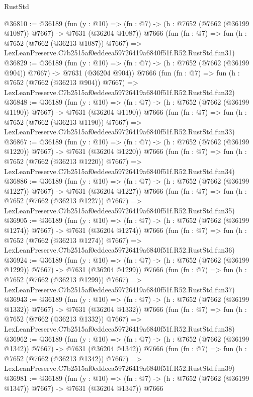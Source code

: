 \begin{lexlean}{RustStd}
\begin{coremodule}
@36810 := @36189
    (fun (y : @10) => (fn : @7) -> (h : @7652 (@7662 (@36199 @1087)) @7667) -> @7631 (@36204 @1087))
    @7666
    (fun (fn : @7) =>
    fun (h : @7652 (@7662 (@36213 @1087)) @7667) =>
    LexLeanPreserve.C7b2515af0eddeea59726419a6840f51f.R52.RustStd.fun31)
@36829 := @36189
    (fun (y : @10) => (fn : @7) -> (h : @7652 (@7662 (@36199 @904)) @7667) -> @7631 (@36204 @904))
    @7666
    (fun (fn : @7) =>
    fun (h : @7652 (@7662 (@36213 @904)) @7667) =>
    LexLeanPreserve.C7b2515af0eddeea59726419a6840f51f.R52.RustStd.fun32)
@36848 := @36189
    (fun (y : @10) => (fn : @7) -> (h : @7652 (@7662 (@36199 @1190)) @7667) -> @7631 (@36204 @1190))
    @7666
    (fun (fn : @7) =>
    fun (h : @7652 (@7662 (@36213 @1190)) @7667) =>
    LexLeanPreserve.C7b2515af0eddeea59726419a6840f51f.R52.RustStd.fun33)
@36867 := @36189
    (fun (y : @10) => (fn : @7) -> (h : @7652 (@7662 (@36199 @1220)) @7667) -> @7631 (@36204 @1220))
    @7666
    (fun (fn : @7) =>
    fun (h : @7652 (@7662 (@36213 @1220)) @7667) =>
    LexLeanPreserve.C7b2515af0eddeea59726419a6840f51f.R52.RustStd.fun34)
@36886 := @36189
    (fun (y : @10) => (fn : @7) -> (h : @7652 (@7662 (@36199 @1227)) @7667) -> @7631 (@36204 @1227))
    @7666
    (fun (fn : @7) =>
    fun (h : @7652 (@7662 (@36213 @1227)) @7667) =>
    LexLeanPreserve.C7b2515af0eddeea59726419a6840f51f.R52.RustStd.fun35)
@36905 := @36189
    (fun (y : @10) => (fn : @7) -> (h : @7652 (@7662 (@36199 @1274)) @7667) -> @7631 (@36204 @1274))
    @7666
    (fun (fn : @7) =>
    fun (h : @7652 (@7662 (@36213 @1274)) @7667) =>
    LexLeanPreserve.C7b2515af0eddeea59726419a6840f51f.R52.RustStd.fun36)
@36924 := @36189
    (fun (y : @10) => (fn : @7) -> (h : @7652 (@7662 (@36199 @1299)) @7667) -> @7631 (@36204 @1299))
    @7666
    (fun (fn : @7) =>
    fun (h : @7652 (@7662 (@36213 @1299)) @7667) =>
    LexLeanPreserve.C7b2515af0eddeea59726419a6840f51f.R52.RustStd.fun37)
@36943 := @36189
    (fun (y : @10) => (fn : @7) -> (h : @7652 (@7662 (@36199 @1332)) @7667) -> @7631 (@36204 @1332))
    @7666
    (fun (fn : @7) =>
    fun (h : @7652 (@7662 (@36213 @1332)) @7667) =>
    LexLeanPreserve.C7b2515af0eddeea59726419a6840f51f.R52.RustStd.fun38)
@36962 := @36189
    (fun (y : @10) => (fn : @7) -> (h : @7652 (@7662 (@36199 @1342)) @7667) -> @7631 (@36204 @1342))
    @7666
    (fun (fn : @7) =>
    fun (h : @7652 (@7662 (@36213 @1342)) @7667) =>
    LexLeanPreserve.C7b2515af0eddeea59726419a6840f51f.R52.RustStd.fun39)
@36981 := @36189
    (fun (y : @10) => (fn : @7) -> (h : @7652 (@7662 (@36199 @1347)) @7667) -> @7631 (@36204 @1347))
    @7666

\end{coremodule}
\end{lexlean}
